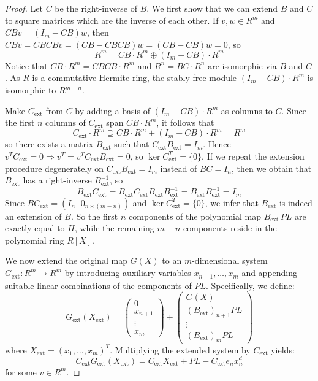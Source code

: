 \documentclass[11pt,a4paper]{article}
\begin{document}
\begin{proof}
Let $C$ be the right-inverse of $B$. We first show that we can extend $B$ and $C$ to square matrices which are the inverse of each other. If $v, w \in R^m$ and $CB v = (I_m - CB) w$, then $CB v = CBCB v = (CB - CBCB) w = (CB - CB) w = 0$, so
$$
R^m = CB \cdot R^m \oplus (I_m - CB) \cdot R^m
$$
Notice that $CB \cdot R^m = CBCB \cdot R^m$ and $R^n = BC \cdot R^n$ are isomorphic via $B$ and $C$. As $R$ is a commutative Hermite ring, the stably free module $(I_m - CB) \cdot R^m$ is isomorphic to $R^{m-n}$. 

Make $C_{\text{ext}}$ from $C$ by adding a basis of $(I_m - CB) \cdot R^m$ as columns to $C$. Since the first $n$ columns of $C_{\text{ext}}$ span $CB \cdot R^m$, it follows that
$$
C_{\text{ext}} \cdot R^m \supseteq CB \cdot R^m + (I_m - CB) \cdot R^m = R^m
$$
so there exists a matrix $B_{\text{ext}}$ such that $C_{\text{ext}} B_{\text{ext}} = I_m$. Hence $v^T C_{\text{ext}} = 0 \Rightarrow v^T = v^T C_{\text{ext}} B_{\text{ext}} = 0$, so $\ker C_{\text{ext}}^T = \{0\}$. If we repeat the extension procedure degenerately on $C_{\text{ext}} B_{\text{ext}} = I_m$ instead of $BC = I_n$, then we obtain that $B_{\text{ext}}$ has a right-inverse $B_{\text{ext}}^{-1}$, so 
$$
B_{\text{ext}}C_{\text{ext}} = B_{\text{ext}}C_{\text{ext}}B_{\text{ext}}B_{\text{ext}}^{-1} = B_{\text{ext}}B_{\text{ext}}^{-1} = I_m
$$
Since $B C_{\text{ext}} = (I_n \,|\, 0_{n \times (m-n)})$ and $\ker C_{\text{ext}}^T = \{0\}$, we infer that $B_{\text{ext}}$ is indeed an extension of $B$. So the first $n$ components of the polynomial map $B_{\text{ext}}\,\mathit{PL}$ are exactly equal to $H$, while the remaining $m-n$ components reside in the polynomial ring $R[X]$.

We now extend the original map $G(X)$ to an $m$-dimensional system $G_{\text{ext}}: R^m \to R^m$ by introducing auxiliary variables $x_{n+1}, \dots, x_m$ and appending suitable linear combinations of the components of $\mathit{PL}$. Specifically, we define:
\[ G_{\text{ext}}(X_{\text{ext}}) = \begin{pmatrix} 0 \\ x_{n+1} \\ \vdots \\ x_m \end{pmatrix} + \begin{pmatrix} G(X) \\ (B_{\text{ext}})_{n+1} \mathit{PL} \\ \vdots \\ (B_{\text{ext}})_m \mathit{PL} \end{pmatrix} \]
where $X_{\text{ext}} = (x_1, \dots, x_m)^T$. 
Multiplying the extended system by $C_{\text{ext}}$ yields:
\[ C_{\text{ext}} G_{\text{ext}}(X_{\text{ext}}) = C_{\text{ext}} X_{\text{ext}} + \mathit{PL} - C_{\text{ext}} e_n x_n^d \]
for some $v \in R^m$.


\end{proof}
\end{document}
